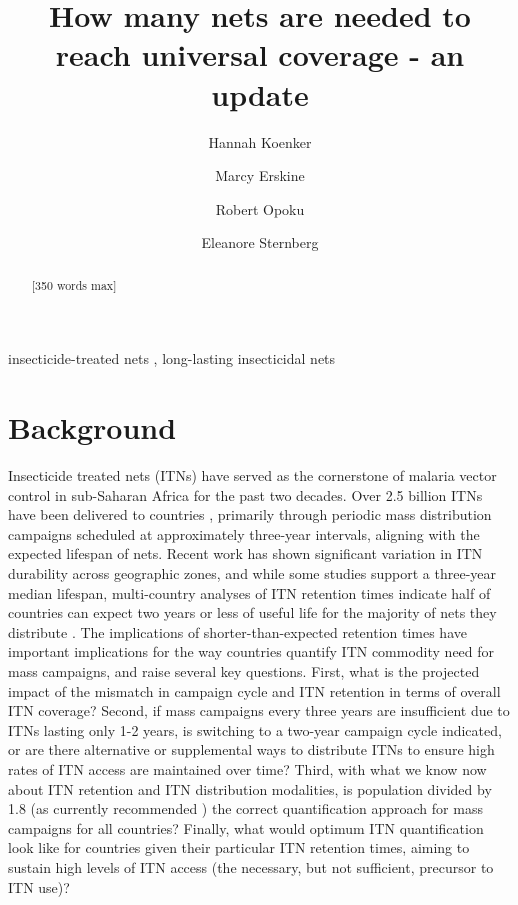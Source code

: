 \documentclass[review,
3p]{elsarticle} %
\begin{document}
\begin{frontmatter}

  \title{How many nets are needed to reach universal coverage - an
update}
    \author[Tropical Health LLP]{Hannah Koenker}
    \author[International Federation of the Red Cross and Red Crescent
Societies]{Marcy Erskine}
    \author[International Federation of the Red Cross and Red Crescent
Societies]{Robert Opoku}
    \author[Tropical Health LLP]{Eleanore Sternberg}
  
  \begin{abstract}
  {[}350 words max{]}
  \end{abstract}
    \begin{keyword}
    insecticide-treated nets \sep 
    long-lasting insecticidal nets
  \end{keyword}
  
 \end{frontmatter}

\hypertarget{background}{%
\section{Background}\label{background}}

Insecticide treated nets (ITNs) have served as the cornerstone of
malaria vector control in sub-Saharan Africa for the past two decades.
Over 2.5 billion ITNs have been delivered to countries
\citep{Milliner:2016um}, primarily through periodic mass distribution
campaigns scheduled at approximately three-year intervals, aligning with
the expected lifespan of nets. Recent work has shown significant
variation in ITN durability across geographic zones, and while some
studies support a three-year median lifespan, multi-country analyses of
ITN retention times indicate half of countries can expect two years or
less of useful life for the majority of nets they distribute
\citep{10.1038/s41467-021-23707-7}. The implications of
shorter-than-expected retention times have important implications for
the way countries quantify ITN commodity need for mass campaigns, and
raise several key questions. First, what is the projected impact of the
mismatch in campaign cycle and ITN retention in terms of overall ITN
coverage? Second, if mass campaigns every three years are insufficient
due to ITNs lasting only 1-2 years, is switching to a two-year campaign
cycle indicated, or are there alternative or supplemental ways to
distribute ITNs to ensure high rates of ITN access are maintained over
time? Third, with what we know now about ITN retention and ITN
distribution modalities, is population divided by 1.8 (as currently
recommended \citep{WorldHealthOrganization:2019ws}) the correct
quantification approach for mass campaigns for all countries? Finally,
what would optimum ITN quantification look like for countries given
their particular ITN retention times, aiming to sustain high levels of
ITN access (the necessary, but not sufficient, precursor to ITN use)?
\end{document}
